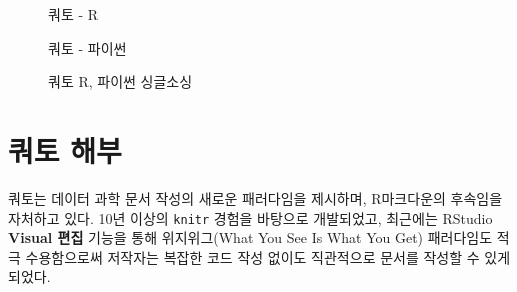 \documentclass[
  letterpaper,
]{book}
\begin{document}
\begin{figure}

\begin{minipage}[t]{\linewidth}

{\centering 


\caption{쿼토 - R}

}

\end{minipage}%
\newline
\begin{minipage}[t]{\linewidth}

{\centering 


\caption{쿼토 - 파이썬}

}

\end{minipage}%

\caption{\label{fig-single-sourcing}쿼토 R, 파이썬 싱글소싱}

\end{figure}

\hypertarget{uxcffcuxd1a0-uxd574uxbd80}{%
\section{쿼토 해부}\label{uxcffcuxd1a0-uxd574uxbd80}}

쿼토는 데이터 과학 문서 작성의 새로운 패러다임을 제시하며, R마크다운의
후속임을 자처하고 있다. 10년 이상의 \texttt{knitr} 경험을 바탕으로
개발되었고, 최근에는 RStudio \textbf{Visual 편집} 기능을 통해
위지위그(What You See Is What You Get) 패러다임도 적극 수용함으로써
저작자는 복잡한 코드 작성 없이도 직관적으로 문서를 작성할 수 있게
되었다.
\end{document}
